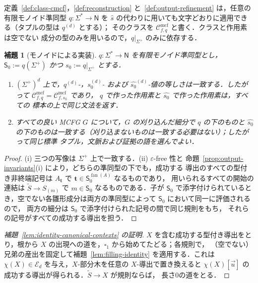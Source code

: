 \documentclass[11pt,a4paper]{ltjsarticle}
\numberwithin{equation}{section}
\theoremstyle{plain}
\newtheorem{lemma}[theorem]{補題}
\theoremstyle{definition}
\theoremstyle{remark}
\newcommand{\Cmcf}[2]{\mathcal{C}^{\mathrm{mcf}}_{#1,#2}}
\newcommand{\tuple}[1]{\vec{#1}}
\newcommand{\blank}{\square}
\newcommand{\eps}{\varepsilon}
\newcommand{\fan}{\operatorname{fan}}
\theoremstyle{plain}
\begin{document}
定義~\ref{def:class-cmcf}，\ref{def:reconstruction}
と~\ref{def:output-refinement} は，任意の有限モノイド準同型
$q:\Sigma^*\to\mathsf N$ を $\widehat s$ の代わりに用いても文字どおりに適用できる（タプルの型は $q^{(d)}$ とする）；
そのクラスを $\Cmcf{f}{q}$ と書く．クラスと作用素は空でない
成分の型のみを用いるので，$q|_{\Sigma^+}$ のみに依存する．

\begin{lemma}[モノイドによる実装]
\label{lem:semigroup-transfer}
$q:\Sigma^*\to \mathsf N$ を有限モノイド準同型とし，$\mathsf S_0:=q(\Sigma^+)$ かつ
$s_0:=q|_{\Sigma^+}$ とする．
\begin{enumerate}[label=\textup{(\roman*)}]
\item $(\Sigma^+)^d$ 上で，$q^{(d)}$-，$s_0^{(d)}$- および
$\widehat{s_0}^{(d)}$-値の等しさは一致する．したがって $\Cmcf{f}{q}=\Cmcf{f}{s_0}$ であり，
$q$ で作った作用素と $\widehat{s_0}$ で作った作用素は，すべての
標本の上で同じ文法を返す．
\item すべての良い MCFG $G$ について，$G$ の刈り込んだ細分で $q$ の下のものと
$\widehat{s_0}$ の下のものは一致する（刈り込まないものは一致する必要はない）；したがって同じ標準
タプル，文脈および証拠の語を選んでよい．
\end{enumerate}
\end{lemma}

\begin{proof}
(i) 三つの写像は $\Sigma^+$ 上で一致する．(ii) $\eps$-free 性と
命題~\ref{prop:output-invariants}(i) により，どちらの準同型の下でも，成功する
導出のすべての型付き非終端記号は $A_{\mathbf t}$ で $\mathbf t\in \mathsf S_0^{\fan(A)}$ なるものであり，
用いられるすべての開始の連結は $\widetilde S\to S_{(m)}$ で $m\in \mathsf S_0$ なるものである．子が
$\mathsf S_0$ で添字付けられているとき，空でない各雛形成分は両方の準同型によって $\mathsf S_0$ において同一に評価されるので，
両方の細分は $\mathsf S_0$ で添字付けられた記号の間で同じ規則をもち，
それらの記号がすべての成功する導出を担う．
\end{proof}

\begin{proof}[補題~\ref{lem:identity-canonical-contexts} の証明]
$X$ を含む成功する型付き導出をとり，根から
$X$ の出現への道を，$\blank_1$ から始めてたどる；各規則で，
（空でない）兄弟の産出を固定して補題~\ref{lem:filling-identity} を適用する．これは
$\chi(X)\in\mathcal E_d$ を与え，$X$-部分木を任意の $X$-導出で置き換えると
$\chi(X)[\tuple u]$ の成功する導出が得られる．$\widetilde S\to X$ が規則ならば，
長さ0の道をとる．
\end{proof}
\end{document}
